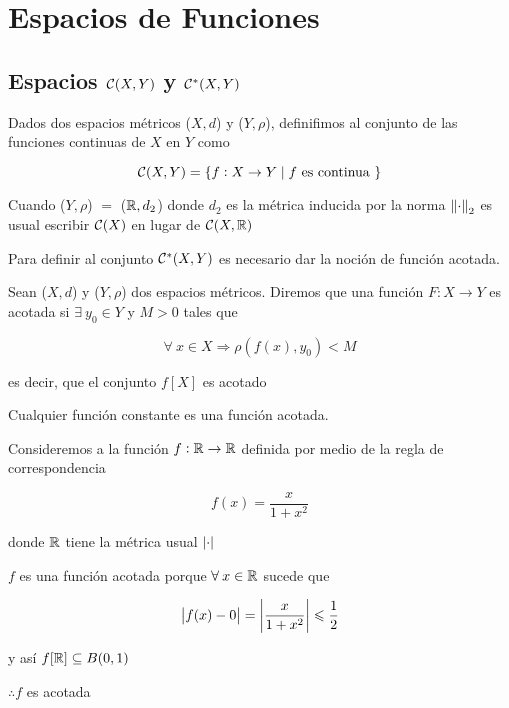 \chapter{Espacios de Funciones}

\section{Espacios $\mathcal{C}(X,Y)$ y ${\mathcal{C}}^{\ast}(X,Y)$}

\begin{definition} \label{defog}
    Dados dos espacios métricos ($X,d$) y ($Y,\rho$), definifimos al conjunto de las funciones continuas de $X$ en $Y$ como

    $$\mathcal{C}(X,Y) = \{ f : X \to Y \mid f \text{ es continua } \}$$
\end{definition}

\begin{notation}
    Cuando ($Y,\rho$) $=$ ($\mathbb{R}, d_2$) donde $d_2$ es la métrica inducida por la norma $\norm{\cdot}_2$ es usual escribir $\mathcal{C}(X)$ en lugar de $\mathcal{C}(X,\mathbb{R})$
\end{notation}

\begin{remark}
    Para definir al conjunto ${\mathcal{C}}^{\ast}(X,Y)$ es necesario dar la noción de función acotada.
\end{remark}

\begin{definition} 
    Sean ($X,d$) y ($Y,\rho$) dos espacios métricos. Diremos que una función $F : X \to Y$ es acotada si $\exists \: y_0 \in Y$ y $M > 0$ tales que

    $$\forall \: x \in X \Rightarrow \rho(f(x),y_0) < M$$

    es decir, que el conjunto $f[X]$ es acotado
\end{definition}

\begin{eg}
    Cualquier función constante es una función acotada.
\end{eg}

\begin{eg}
    Consideremos a la función $f : \mathbb{R} \to \mathbb{R}$ definida por medio de la regla de correspondencia

    $$f(x) = \frac{x}{1+x^2}$$

    donde $\mathbb{R}$ tiene la métrica usual $\abs{\cdot}$
\end{eg}

\begin{proofexplanation}
    $f$ es una función acotada porque $\forall \: x \in \mathbb{R}$ sucede que

    $$\abs{f(x)-0} = \abs{\frac{x}{1+x^2}} \leqslant \frac{1}{2}$$

    y así $f[\mathbb{R}] \subseteq B(0,1)$

    $\therefore f$ es acotada
\end{proofexplanation}

